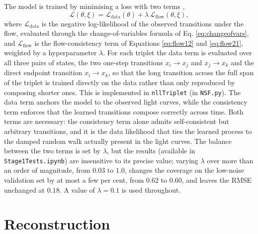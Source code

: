 The model is trained by minimising a loss with two terms \parencite{Kiyohara2025SNF},
\begin{equation}
    \label{eq:loss}
    \mathcal{L}(\theta, \xi) = \mathcal{L}_\mathrm{data}(\theta) + \lambda\,\mathcal{L}_\mathrm{flow}(\theta, \xi),
\end{equation}
where $\mathcal{L}_\mathrm{data}$ is the negative log-likelihood of the observed transitions under the flow, evaluated through the change-of-variables formula of Eq. \ref{eq:changeofvars}, and $\mathcal{L}_\mathrm{flow}$ is the flow-consistency term of Equations \ref{eq:flow12} and \ref{eq:flow21}, weighted by a hyperparameter $\lambda$. For each triplet the data term is evaluated over all three pairs of states, the two one-step transitions $x_i \rightarrow x_j$ and $x_j \rightarrow x_k$ and the direct endpoint transition $x_i \rightarrow x_k$, so that the long transition across the full span of the triplet is trained directly on the data rather than only reproduced by composing shorter ones. This is implemented in \texttt{nllTriplet} (in \texttt{NSF.py}). The data term anchors the model to the observed light curves, while the consistency term enforces that the learned transitions compose correctly across time. Both terms are necessary: the consistency term alone admits self-consistent but arbitrary transitions, and it is the data likelihood that ties the learned process to the damped random walk actually present in the light curves. The balance between the two terms is set by $\lambda$, but the results (available in \texttt{Stage1Tests.ipynb}) are insensitive to its precise value; varying $\lambda$ over more than an order of magnitude, from $0.03$ to $1.0$, changes the coverage on the low-noise validation set by at most a few per cent, from $0.62$ to $0.60$, and leaves the RMSE unchanged at $0.18$. A value of $\lambda = 0.1$ is used throughout.

\section{Reconstruction}
\label{sec:reconstruction}

